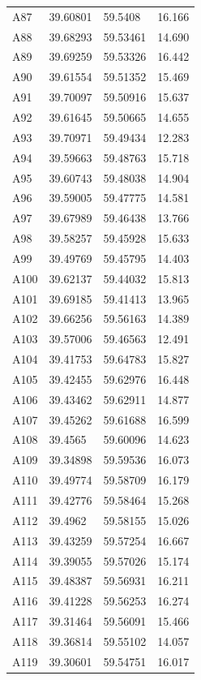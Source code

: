 \documentclass[useAMS,usenatbib]{mn2e}
\begin{document}
\begin{table}
\begin{tabular}{lllc}
	A87 & 39.60801 & 59.5408 & 16.166 \\
	A88 & 39.68293 & 59.53461 & 14.690 \\
	A89 & 39.69259 & 59.53326 & 16.442 \\
	A90 & 39.61554 & 59.51352 & 15.469 \\
	A91 & 39.70097 & 59.50916 & 15.637 \\
	A92 & 39.61645 & 59.50665 & 14.655 \\
	A93 & 39.70971 & 59.49434 & 12.283 \\
	A94 & 39.59663 & 59.48763 & 15.718 \\
	A95 & 39.60743 & 59.48038 & 14.904 \\
	A96 & 39.59005 & 59.47775 & 14.581 \\
	A97 & 39.67989 & 59.46438 & 13.766 \\
	A98 & 39.58257 & 59.45928 & 15.633 \\
	A99 & 39.49769 & 59.45795 & 14.403 \\
	A100 & 39.62137 & 59.44032 & 15.813 \\
	A101 & 39.69185 & 59.41413 & 13.965 \\
	A102 & 39.66256 & 59.56163 & 14.389 \\
	A103 & 39.57006 & 59.46563 & 12.491 \\
	A104 & 39.41753 & 59.64783 & 15.827 \\
	A105 & 39.42455 & 59.62976 & 16.448 \\
	A106 & 39.43462 & 59.62911 & 14.877 \\
	A107 & 39.45262 & 59.61688 & 16.599 \\
	A108 & 39.4565 & 59.60096 & 14.623 \\
	A109 & 39.34898 & 59.59536 & 16.073 \\
	A110 & 39.49774 & 59.58709 & 16.179 \\
	A111 & 39.42776 & 59.58464 & 15.268 \\
	A112 & 39.4962 & 59.58155 & 15.026 \\
	A113 & 39.43259 & 59.57254 & 16.667 \\
	A114 & 39.39055 & 59.57026 & 15.174 \\
	A115 & 39.48387 & 59.56931 & 16.211 \\
	A116 & 39.41228 & 59.56253 & 16.274 \\
	A117 & 39.31464 & 59.56091 & 15.466 \\
	A118 & 39.36814 & 59.55102 & 14.057 \\
	A119 & 39.30601 & 59.54751 & 16.017 \\

\end{tabular}
\end{table}
\end{document}
